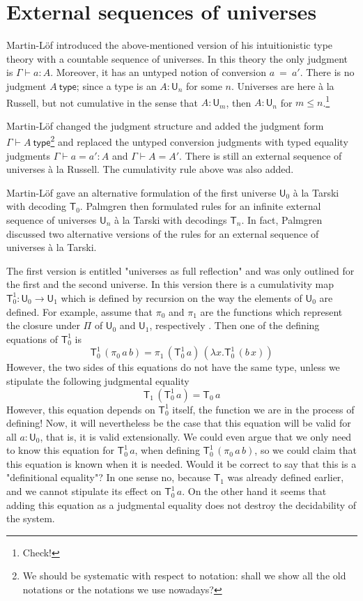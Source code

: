 \documentclass[11pt,a4paper]{article}
\newcommand{\conv}{=}
\def\UU{\mathsf{U}}
\newcommand{\type}{\mathsf{type}}
\newcommand{\U}{\mathsf{U}}
\newcommand{\T}{\mathsf{T}}
\begin{document}
\section{External sequences of universes}

Martin-Löf \cite{martinlof:predicative} introduced the above-mentioned version of his intuitionistic type theory with a countable sequence of universes. In this theory the only judgment is  $\Gamma \vdash a : A$. Moreover, it has an untyped notion of conversion $a\ \conv\ a'$. There is no judgment $A\ \type$; since a type is an $A : \UU_n$ for some $n$. Universes are here \`a la Russell, but not cumulative in the sense that $A : \UU_m$, then $A : \UU_n$ for $m \leq n$.\footnote{Check!}

Martin-Löf \cite{martinlof:hannover} changed the judgment structure and added the judgment form $\Gamma \vdash A\ \type$\footnote{We should be systematic with respect to notation: shall we show all the old notations or the notations we use nowadays?} and replaced the untyped conversion judgments with typed equality judgments $\Gamma \vdash a = a' : A$ and $\Gamma \vdash A = A'$. There is still an external sequence of universes \`a la Russell. The cumulativity rule above was also added.

Martin-Löf \cite{martinlof:bibliopolis} gave an alternative formulation of the first universe $\UU_0$ \`a la Tarski with decoding $\T_0$.
Palmgren \cite{palmgren:phd} then formulated rules for an infinite external sequence of universes $\UU_n$ \`a la Tarski with decodings $\T_n$. In fact, Palmgren discussed two alternative versions of the rules for an external sequence of universes \`a la Tarski. 

The first version is entitled "universes as full reflection" and was only outlined for the first and the second universe. In this version there is a cumulativity map $\T_0^1 : \UU_0 \to \UU_1$ which is defined by recursion on the way the elements of $\UU_0$ are defined. For example, assume that $\pi_0$ and $\pi_1$ are the functions which represent the closure under $\Pi$ of $\U_0$ and $\U_1$, respectively . Then one of the defining equations of $\T_0^1$ is
$$
\T_0^1\, (\pi_0\,a\, b) = \pi_1\,(\T_0^1\,a)\,(\lambda x.\T_0^1\,(b\,x))
$$
However, the two sides of this equations do not have the same type, unless we stipulate the following judgmental equality
$$
\T_1\, (\T_0^1\, a) = \T_0\, a
$$
However, this equation depends on $\T_0^1$ itself, the function we are in the process of defining! Now, it will nevertheless be the case that this equation will be valid for all $a : \U_0$, that is, it is valid extensionally. We could even argue that we only need to know this equation for $\T_0^1\, a$, when defining $\T_0^1\, (\pi_0\,a\, b)$, so we could claim that this equation is known when it is needed. Would it be correct to say that this is a "definitional equality"? In one sense no, because $\T_1$ was already defined earlier, and we cannot stipulate its effect on $\T_0^1\, a$. On the other hand it seems that adding this equation as a judgmental equality does not destroy the decidability of the system.
\end{document}
